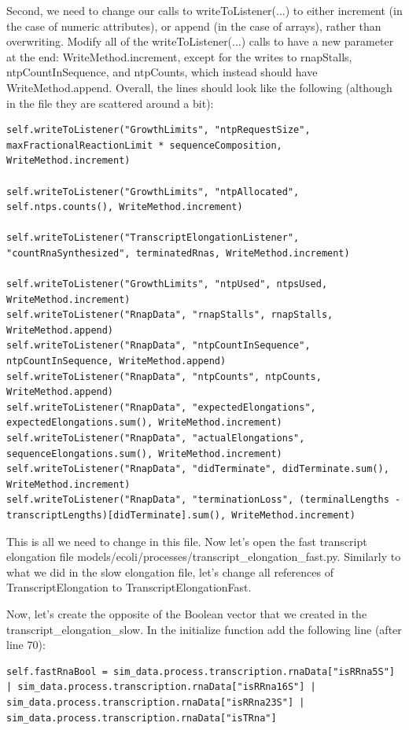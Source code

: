 \documentclass[12pt]{article}
\begin{document}
Second, we need to change our calls to writeToListener(...) to either increment (in the case of numeric attributes), or append (in the case of arrays), rather than overwriting. Modify all of the writeToListener(...) calls to have a new parameter at the end:  WriteMethod.increment, except for the writes to rnapStalls, ntpCountInSequence, and ntpCounts, which instead should have WriteMethod.append. Overall, the lines should look like the following (although in the file they are scattered around a bit):
\begin{lstlisting}
self.writeToListener("GrowthLimits", "ntpRequestSize", maxFractionalReactionLimit * sequenceComposition, WriteMethod.increment)

self.writeToListener("GrowthLimits", "ntpAllocated", self.ntps.counts(), WriteMethod.increment)

self.writeToListener("TranscriptElongationListener", "countRnaSynthesized", terminatedRnas, WriteMethod.increment)

self.writeToListener("GrowthLimits", "ntpUsed", ntpsUsed, WriteMethod.increment)
self.writeToListener("RnapData", "rnapStalls", rnapStalls, WriteMethod.append)
self.writeToListener("RnapData", "ntpCountInSequence", ntpCountInSequence, WriteMethod.append)
self.writeToListener("RnapData", "ntpCounts", ntpCounts, WriteMethod.append)
self.writeToListener("RnapData", "expectedElongations", expectedElongations.sum(), WriteMethod.increment)
self.writeToListener("RnapData", "actualElongations", sequenceElongations.sum(), WriteMethod.increment)
self.writeToListener("RnapData", "didTerminate", didTerminate.sum(), WriteMethod.increment)
self.writeToListener("RnapData", "terminationLoss", (terminalLengths - transcriptLengths)[didTerminate].sum(), WriteMethod.increment)
\end{lstlisting}

This is all we need to change in this file. Now let’s open the fast transcript elongation file models/ecoli/processes/transcript\_elongation\_fast.py. Similarly to what we did in the slow elongation file, let’s change all references of TranscriptElongation to TranscriptElongationFast.

Now, let’s create the opposite of the Boolean vector that we created in the transcript\_elongation\_slow. In the initialize function add the following line (after line 70):

\lstset{language=Python}
\begin{lstlisting}
self.fastRnaBool = sim_data.process.transcription.rnaData["isRRna5S"] | sim_data.process.transcription.rnaData["isRRna16S"] | sim_data.process.transcription.rnaData["isRRna23S"] | sim_data.process.transcription.rnaData["isTRna"]
\end{lstlisting}
\end{document}
